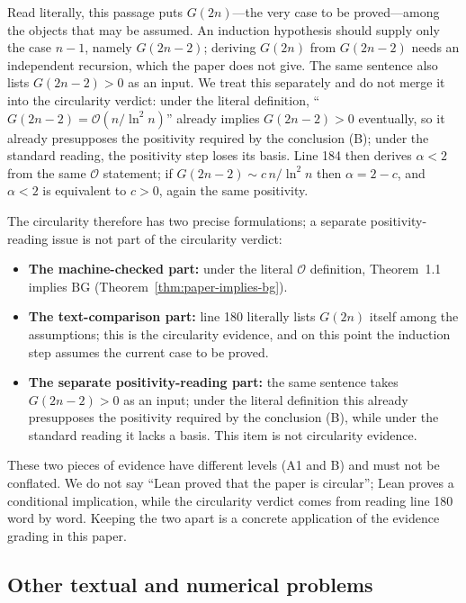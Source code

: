 \documentclass[11pt,a4paper]{article}
\theoremstyle{plain}
\theoremstyle{definition}
\newcommand{\BG}{\mathrm{BG}}
\begin{document}
\noindent Read literally, this passage puts $G(2n)$---the very case to be proved---among the objects that may be assumed. An induction hypothesis should supply only the case $n-1$, namely $G(2n-2)$; deriving $G(2n)$ from $G(2n-2)$ needs an independent recursion, which the paper does not give. The same sentence also lists $G(2n-2)>0$ as an input. We treat this separately and do not merge it into the circularity verdict: under the literal definition, ``$G(2n-2)=\mathcal O(n/\ln^2 n)$'' already implies $G(2n-2)>0$ eventually, so it already presupposes the positivity required by the conclusion (B); under the standard reading, the positivity step loses its basis. Line 184 then derives $\alpha<2$ from the same $\mathcal O$ statement; if $G(2n-2)\sim c\,n/\ln^2 n$ then $\alpha=2-c$, and $\alpha<2$ is equivalent to $c>0$, again the same positivity.

The circularity therefore has two precise formulations; a separate positivity-reading issue is not part of the circularity verdict:

\begin{itemize}
\item \textbf{The machine-checked part:} under the literal $\mathcal O$ definition, Theorem~1.1 implies $\BG$ (Theorem~\ref{thm:paper-implies-bg}).
\item \textbf{The text-comparison part:} line 180 literally lists $G(2n)$ itself among the assumptions; this is the circularity evidence, and on this point the induction step assumes the current case to be proved.
\item \textbf{The separate positivity-reading part:} the same sentence takes $G(2n-2)>0$ as an input; under the literal definition this already presupposes the positivity required by the conclusion (B), while under the standard reading it lacks a basis. This item is not circularity evidence.
\end{itemize}

These two pieces of evidence have different levels (A1 and B) and must not be conflated. We do not say ``Lean proved that the paper is circular''; Lean proves a conditional implication, while the circularity verdict comes from reading line 180 word by word. Keeping the two apart is a concrete application of the evidence grading in this paper.

\subsection{Other textual and numerical problems}
\label{sec:paper-other}
\end{document}
